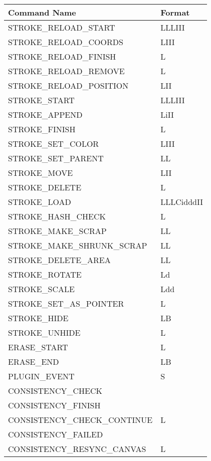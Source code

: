 \begin{table}[h]
  \begin{tabular}{ | l | l | }
  \hline
  \textbf{Command Name} & \textbf{Format} \\ 
  \hline
  STROKE\_RELOAD\_START & LLLIII \\
  \hline
  STROKE\_RELOAD\_COORDS & LIII \\
  \hline
  STROKE\_RELOAD\_FINISH & L \\
  \hline
  STROKE\_RELOAD\_REMOVE & L \\
  \hline
  STROKE\_RELOAD\_POSITION & LII \\
  \hline

  STROKE\_START & LLLIII \\
  \hline
  STROKE\_APPEND & LiII \\
  \hline
  STROKE\_FINISH & L \\
  \hline
  STROKE\_SET\_COLOR & LIII \\
  \hline
  STROKE\_SET\_PARENT & LL \\
  \hline
  STROKE\_MOVE & LII \\
  \hline
  STROKE\_DELETE & L \\
  \hline
  STROKE\_LOAD & LLLCidddII \\
  \hline
  STROKE\_HASH\_CHECK & L \\
  \hline
  STROKE\_MAKE\_SCRAP & LL \\
  \hline
  STROKE\_MAKE\_SHRUNK\_SCRAP & LL \\
  \hline
  STROKE\_DELETE\_AREA & LL \\
  \hline
  STROKE\_ROTATE & Ld \\
  \hline
  STROKE\_SCALE & Ldd \\
  \hline
  STROKE\_SET\_AS\_POINTER & L \\
  \hline
  STROKE\_HIDE & LB \\
  \hline
  STROKE\_UNHIDE & L \\
  \hline

  ERASE\_START & L \\
  \hline
  ERASE\_END & LB \\
  \hline

  PLUGIN\_EVENT & S \\
  \hline



  CONSISTENCY\_CHECK &  \\
  \hline
  CONSISTENCY\_FINISH &  \\
  \hline
  CONSISTENCY\_CHECK\_CONTINUE & L \\
  \hline
  CONSISTENCY\_FAILED &  \\
  \hline
  CONSISTENCY\_RESYNC\_CANVAS & L \\
  \hline



\end{tabular}
\end{table}
